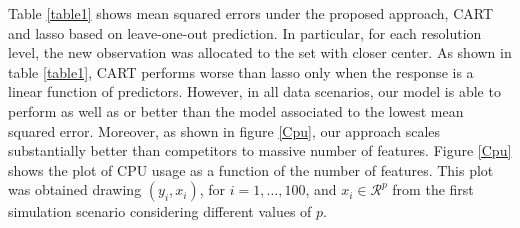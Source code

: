\documentclass{article}
\begin{document}
Table \ref{table1} shows mean squared errors under the proposed approach, CART and lasso based on leave-one-out prediction. In particular, for each resolution level, the new observation was allocated to the set with closer center. As shown in table \ref{table1}, CART performs worse than lasso only when the response is a linear function of predictors. However, in all data scenarios, our model is able to perform as well as or better than the model associated to the lowest mean squared error. Moreover, as shown in figure \ref{Cpu}, our approach scales substantially better than competitors to massive number of features. Figure \ref{Cpu} shows the plot of CPU usage as a function of the number of features. This plot was obtained drawing $(y_i, x_i)$, for $i=1, \ldots, 100$, and $x_i \in \mathcal{R}^p$  from the first simulation scenario considering different values of $p$.
\end{document}
